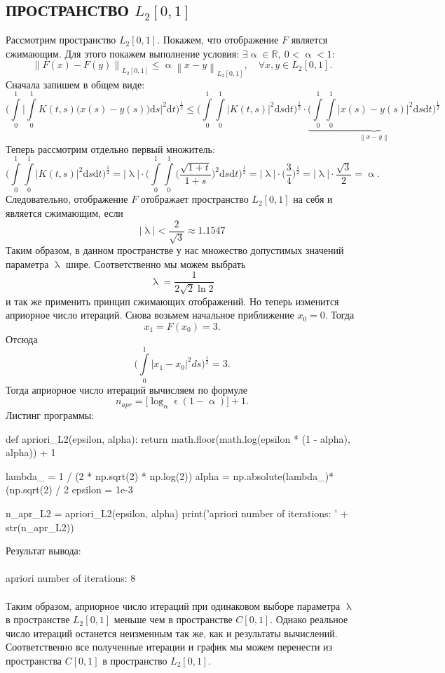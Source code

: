 \documentclass[a4paper, 12pt]{report}
\newcommand\Norm[1]{\left\| #1 \right\|}
\renewcommand{\leq}{\leqslant}
\renewcommand{\alpha}{\upalpha}
\renewcommand{\lambda}{\uplambda}
\renewcommand{\epsilon}{\upvarepsilon}
\begin{document}
			\subsection*{ПРОСТРАНСТВО $L_2[0,1]$}
			Рассмотрим пространство $L_2[0,1]$. Покажем, что отображение $F$ является сжимающим. Для этого покажем выполнение условия: $\exists \alpha \in \mathbb{R},\ 0<\alpha<1:$ $$\Norm{F(x) - F(y)}_{L_2[0,1]} \leq \alpha\Norm{x - y}_{L_2[0,1]},\quad \forall x,y \in {L_2[0,1]}.$$
			Сначала запишем в общем виде:
			$$\Big(\int\limits_0^1\Big|\int\limits_0^1 K(t,s) \big(x(s) - y(s)\big)\mathrm{d}s\Big|^2\mathrm{d}t\Big)^\frac12
			\leq \Big(\int\limits_0^1\int\limits_0^1 |K(t,s)|^2 \mathrm{d}s\mathrm{d}t\Big)^\frac12\cdot\underbrace{ \Big(\int\limits_0^1\int\limits_0^1 |x(s) - y(s)|^2 \mathrm{d}s\mathrm{d}t\Big)^\frac12}_{\Norm{x-y}}$$
			Теперь рассмотрим отдельно первый множитель:
			$$\Big(\int\limits_0^1\int\limits_0^1 |K(t,s)|^2 \mathrm{d}s\mathrm{d}t\Big)^\frac12 = |\lambda|\cdot \Big(\int\limits_0^1\int\limits_0^1 \Big(\dfrac{\sqrt{1 + t}}{1 + s} \Big)^2 \mathrm{d}s\mathrm{d}t\Big)^\frac12 = |\lambda|\cdot \Big(\dfrac{3}{4}\Big)^\frac12 = |\lambda|\cdot\dfrac{\sqrt{3}}{2} = \alpha.$$
			Следовательно, отображение $F$ отображает пространство $L_2[0,1]$ на себя и является сжимающим, если $$|\lambda| < \dfrac{2}{\sqrt{3}}\approx 1.1547$$
			Таким образом, в данном пространстве у нас множество допустимых значений параметра $\lambda$ шире. Соответственно мы можем выбрать $$\lambda = \dfrac{1}{2 \sqrt{2} \ln{2}}$$ и так же применить принцип сжимающих отображений. Но теперь изменится априорное число итераций. Снова возьмем начальное приближение $x_0 = 0$. Тогда $$x_1 = F(x_0) = 3.$$
			Отсюда $$\Big(\int\limits_0^1|x_1 - x_0|^2ds\Big)^\frac12 = 3.$$
			Тогда априорное число итераций вычисляем по формуле $$n_{apr} = \Big[\log_\alpha \epsilon(1-\alpha)\Big] + 1.$$
			Листинг программы:
			\begin{python}
				def apriori_L2(epsilon, alpha):
					return math.floor(math.log(epsilon * (1 - alpha), alpha)) + 1
				
				lambda_ = 1 / (2 * np.sqrt(2) * np.log(2))
				alpha = np.absolute(lambda_)*(np.sqrt(2) / 2
				epsilon = 1e-3
				
				n_apr_L2 = apriori_L2(epsilon, alpha)
				print('apriori number of iterations: ' + str(n_apr_L2))\end{python}
				Результат вывода:\\\\
				apriori number of iterations: 8\\\\
				Таким образом, априорное число итераций при одинаковом выборе параметра $\lambda$ в пространстве $L_2[0,1]$ меньше чем в пространстве $C[0,1]$. Однако реальное число итераций останется неизменным так же, как и результаты вычислений. Соответственно все полученные итерации и график мы можем перенести из пространства $C[0,1]$ в пространство $L_2[0,1]$.
\end{document}
